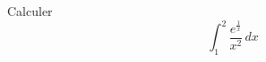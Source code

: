 Calculer 
\begin{displaymath}
  \int_{1}^{2}\frac{e^\frac{1}{x}}{x^2}\,dx
\end{displaymath}

\bigskip